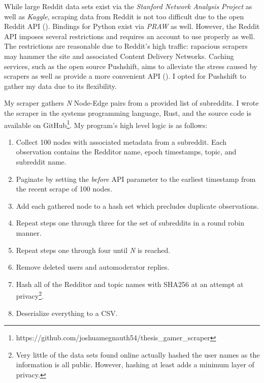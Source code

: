 \documentclass[12pt, a4paper]{article}
\begin{document}
While large Reddit data sets exist via the \textit{Stanford Network Analysis Project} as well as \textit{Kaggle}, scraping data from Reddit is not too difficult due to the open Reddit API (\cite{redditapi}). Bindings for Python exist via \textit{PRAW} as well. However, the Reddit API imposes several restrictions and requires an account to use properly as well. The restrictions are reasonable due to Reddit's high traffic: rapacious scrapers may hammer the site and associated Content Delivery Networks. Caching services, such as the open source Pushshift, aims to alleviate the stress caused by scrapers as well as provide a more convenient API (\cite{pushshiftapi}). I opted for Pushshift to gather my data due to its flexibility.

My scraper gathers \textit{N} Node-Edge pairs from a provided list of subreddits. I wrote the scraper in the systems programming language, Rust, and the source code is available on GitHub\footnote{https://github.com/joshuamegnauth54/thesis\_gamer\_scraper}. My program's high level logic is as follows:

\begin{enumerate}
  \item Collect 100 nodes with associated metadata from a subreddit. Each observation contains the Redditor name, epoch timestamps, topic, and subreddit name.
  \item Paginate by setting the \textit{before} API parameter to the earliest timestamp from the recent scrape of 100 nodes.
  \item Add each gathered node to a hash set which precludes duplicate observations.
  \item Repeat steps one through three for the set of subreddits in a round robin manner.
  \item Repeat steps one through four until \textit{N} is reached.
  \item Remove deleted users and automoderator replies.
  \item Hash all of the Redditor and topic names with SHA256 at an attempt at privacy\footnote{Very little of the data sets found online actually hashed the user names as the information is all public. However, hashing at least adds a minimum layer of privacy.}.
  \item Deserialize everything to a CSV.
\end{enumerate}
\end{document}
